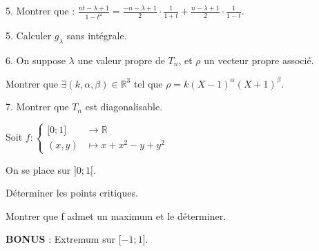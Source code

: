 \vspace{5pt}
5. Montrer que :
$\displaystyle \frac {nt - \lambda + 1} {1 - t^2} = \frac {-n - \lambda + 1} {2} \cdot \frac {1} {1 + t}
+ \frac {n - \lambda + 1} {2} \cdot \frac {1} {1 - t}$.

\vspace{5pt}
5. Calculer $g_\lambda$ sans intégrale.

\vspace{5pt}
6. On suppose $\lambda$ une valeur propre de $T_n$, et $\rho$ un vecteur propre associé.

Montrer que $\exists (k, \alpha, \beta) \in \mathbb{R}^3$ tel que $\rho = k(X-1)^\alpha(X+1)^\beta$.

\vspace{5pt}
7. Montrer que $T_n$ est diagonalisable.




\subetoiles




\noindent Soit $f : 
\begin{cases}
  \lbrack 0; 1 \rbrack & \longrightarrow \mathbb{R} \\    
  (x,y) & \longmapsto x + x^2 - y + y^2
\end{cases}
$

\vspace{5pt}
\noindent On se place sur $\rbrack 0; 1 \lbrack$.

\vspace{5pt}
Déterminer les points critiques.

\vspace{5pt}
Montrer que f admet un maximum et le déterminer.

\vspace{5pt}
{\bfseries BONUS} : Extremum sur $\lbrack -1; 1 \rbrack$.